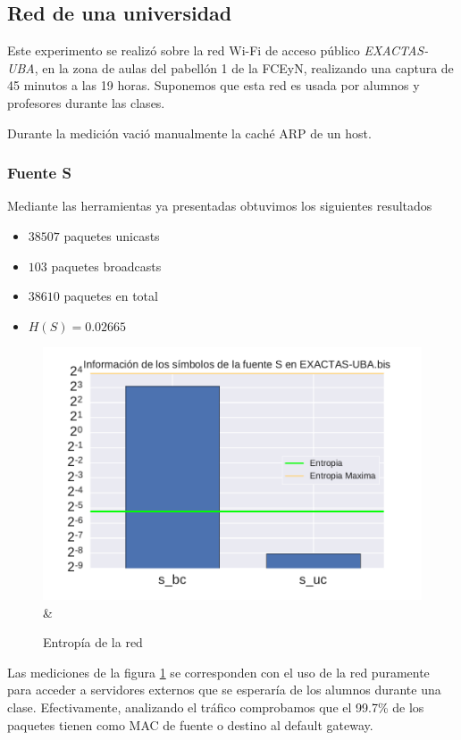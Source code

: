 
\subsection{Red de una universidad}
Este experimento se realizó sobre la red Wi-Fi de acceso público \textit{EXACTAS-UBA}, en la zona de aulas del pabellón 1 de la FCEyN, realizando una captura de 45 minutos a las 19 horas.
Suponemos que esta red es usada por alumnos y profesores durante las clases.

Durante la medición vació manualmente la caché ARP de un host.

\subsubsection{Fuente S}

Mediante las herramientas ya presentadas obtuvimos los siguientes resultados
\begin{itemize}
 \item $38507$ paquetes unicasts
 \item $103$ paquetes broadcasts
 \item $38610$ paquetes en total
 \item $H(S) = 0.02665$
\end{itemize}

\begin{figure}[H]
   \centering
       \includegraphics[page=1,width=.70\textwidth]{../img/barras-EXACTAS-UBA-bis} &
 \caption{Entropía de la red}
 \label{fig:barras-exactas}
\end{figure}

Las mediciones de la figura \ref{fig:barras-exactas} se corresponden con el uso de la red puramente para acceder a servidores externos que se esperaría de los alumnos durante una clase.
Efectivamente, analizando el tráfico comprobamos que el 99.7\% de los paquetes tienen como MAC de fuente o destino al default gateway.

